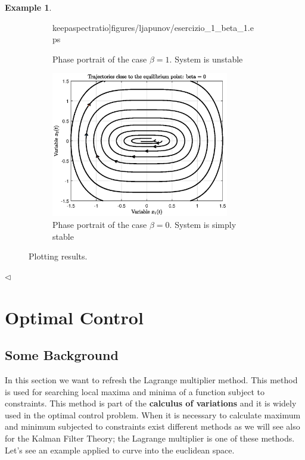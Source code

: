 \documentclass[11pt,a4paper,oneside]{book}
\numberwithin{equation}{section}
\theoremstyle{it}
\theoremstyle{definition}
\newtheorem{example}{Example}[chapter]
\begin{document}
\begin{example}
\begin{figure}[H]
\begin{subfigure}{.5\textwidth}
			keepaspectratio]{figures/ljapunov/esercizio_1_beta_1.eps}
			\captionsetup{width=0.75\textwidth}		
			\caption{Phase portrait of the case $\beta=1$. System is unstable}
			\label{figure_example_case_beta1}
		\end{subfigure}
		\begin{subfigure}{.5\textwidth}
			\centering
			\includegraphics[width = 220pt, 
			keepaspectratio]{figures/ljapunov/esercizio_1_beta_0.eps}
			\captionsetup{width=0.75\textwidth}		
			\caption{Phase portrait of the case $\beta=0$. System is simply 
			stable}
			\label{figure_example_case_beta0}
		\end{subfigure}
		\caption{Plotting results.}
		\label{}
	\end{figure}
	
	$\triangleleft$
\end{example}

\chapter{Optimal Control}
\section{Some Background}
In this section we want to refresh the Lagrange multiplier method. This method 
is used for searching local maxima and minima of a function subject to 
constraints. This method is part of the \textbf{calculus of variations} and it 
is widely used in the optimal control problem. When it is necessary to 
calculate maximum and minimum subjected to constraints exist different methods 
as we will see also for the Kalman Filter Theory; the Lagrange multiplier is 
one of these methods. Let's see an example applied to curve into the euclidean 
space.
\end{document}
